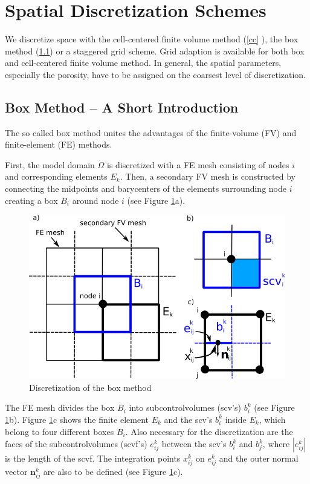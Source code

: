 \section{Spatial Discretization Schemes}
\label{spatialdiscretization}

We discretize space with the cell-centered finite volume method (\ref{cc} ), the box method (\ref{box})
or a staggered grid scheme.
Grid adaption is available for both box and cell-centered finite volume method.
In general, the spatial  parameters, especially the porosity, have to be assigned on
the coarsest level of discretization.

\subsection{Box Method -- A Short Introduction}\label{box}

The so called box method unites the advantages of the finite-volume (FV) and
finite-element (FE) methods.

First, the model domain $\Omega$ is discretized with a FE mesh consisting of nodes
$i$ and corresponding elements $E_k$. Then, a secondary FV mesh is constructed
by connecting the midpoints and barycenters of the elements surrounding node
$i$ creating a box $B_i$ around node $i$ (see Figure \ref{pc:box}a).

\begin{figure} [ht]
\includegraphics[width=0.8\linewidth,keepaspectratio]{png/box_disc.png}
\caption{\label{pc:box} Discretization of the box method}
\end{figure}

The FE mesh divides the box $B_i$ into subcontrolvolumes (scv's) $b^k_i$
(see Figure \ref{pc:box}b). Figure \ref{pc:box}c shows the finite element $E_k$
and the scv's $b^k_i$ inside $E_k$, which belong to four different boxes $B_i$.
Also necessary for the discretization are the faces of the subcontrolvolumes (scvf's)
$e^k_{ij}$ between the scv's $b^k_i$ and $b^k_j$, where $|e^k_{ij}|$ is the length
of the scvf. The integration points $x^k_{ij}$ on $e^k_{ij}$ and the outer normal
vector $\mathbf n^k_{ij}$ are also to be defined (see Figure \ref{pc:box}c).

